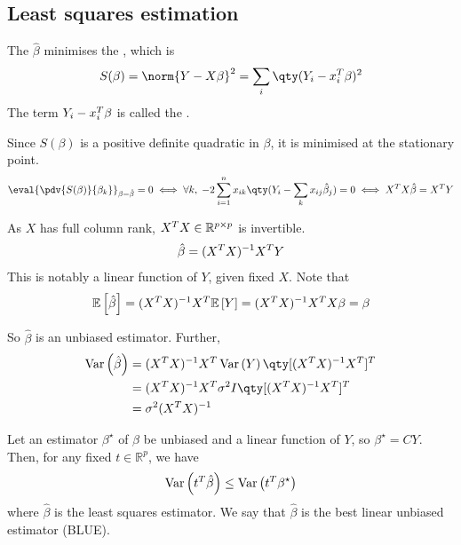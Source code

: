 \subsection{Least squares estimation}
\begin{definition}
	The  $\hat \beta$ minimises the , which is
	\begin{align*}
		S(\beta) = \norm{Y-X\beta}^2 = \sum_i \qty(Y_i - x_i^\tran \beta)^2
	\end{align*}
	The term $Y_i - x_i^T \beta$ is called the .
\end{definition}

Since $S(\beta)$ is a positive definite quadratic in $\beta$, it is minimised at the stationary point.
\begin{align*}
	\eval{\pdv{S(\beta)}{\beta_k}}_{\beta = \hat \beta} = 0 \iff \forall k,\;-2\sum_{i=1}^n x_{ik} \qty(Y_i - \sum_k x_{ij} \hat \beta_j) = 0 \iff X^\tran X \hat \beta = X^\tran Y
\end{align*}

As $X$ has full column rank, $X^T X \in \mathbb{R}^{p \times p}$ is invertible.
\begin{align*}
	\hat \beta = (X^T X)^{-1} X^T Y
\end{align*}
This is notably a linear function of $Y$, given fixed $X$.
Note that
\begin{align*}
	\mathbb{E}\left[{\hat \beta}\right] = (X^T X)^{-1} X^T \mathbb{E}\left[{Y}\right] = (X^T X)^{-1} X^T X\beta = \beta
\end{align*}

So $\hat \beta$ is an unbiased estimator.
Further,
\begin{align*}
	\Var{\hat \beta} &= (X^\tran X)^{-1} X^\tran \Var Y \qty[(X^\tran X)^{-1} X^\tran]^\tran     \\
	                 &= (X^\tran X)^{-1} X^\tran \sigma^2 I \qty[(X^\tran X)^{-1} X^\tran]^\tran \\
	                 &= \sigma^2 (X^\tran X)^{-1}
\end{align*}

\begin{theorem} \label{thm:gauss}
	Let an estimator $\beta^\star$ of $\beta$ be unbiased and a linear function of $Y$, so $\beta^\star = CY$.
	Then, for any fixed $t \in \mathbb R^p$, we have
	\begin{align*}
		\operatorname{Var}\left({t^T \hat \beta}\right) \leq \operatorname{Var}\left({t^T \beta^\star}\right)
	\end{align*}
	where $\hat \beta$ is the least squares estimator.
	We say that $\hat \beta$ is the best linear unbiased estimator (BLUE).
\end{theorem}

